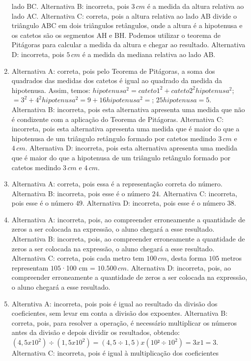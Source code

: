 \begin{enumerate}
lado BC.
Alternativa B: incorreta, pois $3\,cm$ é a medida da altura relativa ao
lado AC.
Alternativa C: correta, pois a altura relativa ao lado AB divide o
triângulo ABC em dois triângulos retângulos, onde a altura é a
hipotenusa e os catetos são os segmentos AH e BH. Podemos utilizar o
teorema de Pitágoras para calcular a medida da altura e chegar ao
resultado.
Alternativa D: incorreta, pois $5\,cm$ é a medida da mediana relativa ao
lado AB.
\item Alternativa A: correta, pois pelo Teorema de Pitágoras, a soma dos
quadrados das medidas dos catetos é igual ao quadrado da medida da
hipotenusa. Assim, temos: $hipotenusa^2 = cateto1^2 + cateto2^2 hipotenusa^2$; $= 3^2 + 4^2 hipotenusa^2 = 9 + 16 hipotenusa^2 =$; $25 hipotenusa = 5$.
Alternativa B: incorreta, pois esta alternativa apresenta uma medida que
não é condizente com a aplicação do Teorema de Pitágoras.
Alternativa C: incorreta, pois esta alternativa apresenta uma medida que
é maior do que a hipotenusa de um triângulo retângulo formado por
catetos medindo $3\,cm$ e $4\,cm$.
Alternativa D: incorreta, pois esta alternativa apresenta uma medida que
é maior do que a hipotenusa de um triângulo retângulo formado por
catetos medindo $3\,cm$ e $4\,cm$.
\item Alternativa A: correta, pois essa é a representação correta do número.
Alternativa B: incorreta, pois esse é o número $24$.
Alternativa C: incorreta, pois esse é o número $49$.
Alternativa D: incorreta, pois esse é o número $38$.
\item 
Alternativa A: incorreta, pois, ao compreender erroneamente a quantidade
de zeros a ser colocada na expressão, o aluno chegará a esse resultado.
Alternativa B: incorreta, pois, ao compreender erroneamente a quantidade
de zeros a ser colocada na expressão, o aluno chegará a esse resultado.
Alternativa C: correta, pois cada metro tem $100\,cm$, desta forma $105$
metros representam $105$·100 cm = $10.500\,cm$.
Alternativa D: incorreta, pois, ao compreender erroneamente a quantidade
de zeros a ser colocada na expressão, o aluno chegará a esse resultado.
\item Alterntiva A: incorreta, pois pois é igual ao resultado da divisão dos
coeficientes, sem levar em conta a divisão dos expoentes.
Alternativa B: correta, pois, para resolver a operação, é necessário
multiplicar os números antes da divisão e depois dividir os resultados,
obtendo: $(4,5 x 10^2) ÷ (1,5 x 10^2) = (4,5 ÷ 1,5) x (10² ÷ 10^2) = 3 x 1 = 3$.
Alternativa C: incorreta, pois é igual à multiplicação dos coeficientes

\end{enumerate}
